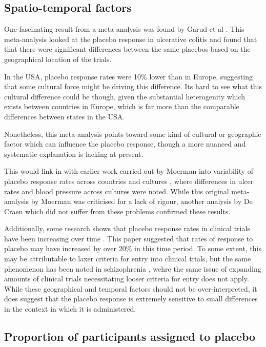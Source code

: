 \subsection{Spatio-temporal factors}
\label{sec:geogr-diff-plac}

One fascinating result from a meta-analysis was found by Garud et al \cite{Garud2008}. This meta-analysis looked at the placebo response in ulcerative colitis and  found that  that there were significant differences between the same placebos based on the geographical location of the trials. 

In the USA, placebo response rates were 10\% lower than in Europe, suggesting that some cultural force might be driving this difference. Its hard to see what this cultural difference could be though, given the substantial heterogenity which exists between countries in Europe, which is far more than the comparable differences between states in the USA. 

Nonetheless, this meta-analysis points toward some kind of cultural or geographic factor which can influence the placebo response, though a more nuanced and systematic explanation is lacking at present. 

This would link in with earlier work carried out by Moerman into variability of placebo response rates across countries and cultures \cite{Moerman2000}, where differences in ulcer rates and blood pressure across cultures were noted. While this original meta-analysis by Moerman was criticised for a lack of rigour, another analysis by  De Craen which did not suffer from these problems \cite{Craen1999a} confirmed these results. 

Additionally, some research shows that placebo response rates in clinical trials have been increasing over time \cite{Enck2005a}. This paper suggested that rates of response to placebo may have increased by over 20\% in this time period. To some extent, this may be attributable to laxer criteria for entry into clinical trials, but the same phenomenon has been noted in schizophrenia \cite{Ravi2008}, wehre the same issue of expanding amounts of clinical trials necessitating looser criteria for entry does not apply. While these geographical and temporal factors should not be over-interpreted, it does suggest that the placebo response is extremely sensitive to small differences in the context in which it is administered. 

\subsection{Proportion of participants assigned to placebo}
\label{sec:effects-clin-trial}

